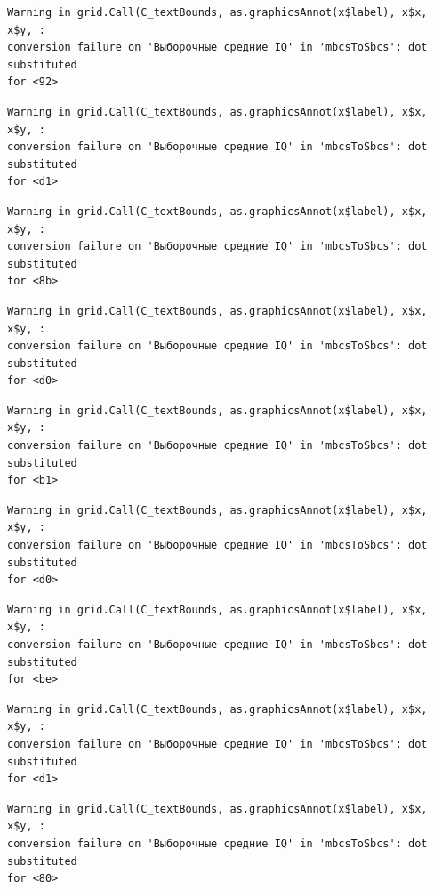 \documentclass[
  letterpaper,
  DIV=11,
  numbers=noendperiod]{scrreprt}
\theoremstyle{definition}
\theoremstyle{remark}
\begin{document}
\begin{verbatim}
Warning in grid.Call(C_textBounds, as.graphicsAnnot(x$label), x$x, x$y, :
conversion failure on 'Выборочные средние IQ' in 'mbcsToSbcs': dot substituted
for <92>
\end{verbatim}

\begin{verbatim}
Warning in grid.Call(C_textBounds, as.graphicsAnnot(x$label), x$x, x$y, :
conversion failure on 'Выборочные средние IQ' in 'mbcsToSbcs': dot substituted
for <d1>
\end{verbatim}

\begin{verbatim}
Warning in grid.Call(C_textBounds, as.graphicsAnnot(x$label), x$x, x$y, :
conversion failure on 'Выборочные средние IQ' in 'mbcsToSbcs': dot substituted
for <8b>
\end{verbatim}

\begin{verbatim}
Warning in grid.Call(C_textBounds, as.graphicsAnnot(x$label), x$x, x$y, :
conversion failure on 'Выборочные средние IQ' in 'mbcsToSbcs': dot substituted
for <d0>
\end{verbatim}

\begin{verbatim}
Warning in grid.Call(C_textBounds, as.graphicsAnnot(x$label), x$x, x$y, :
conversion failure on 'Выборочные средние IQ' in 'mbcsToSbcs': dot substituted
for <b1>
\end{verbatim}

\begin{verbatim}
Warning in grid.Call(C_textBounds, as.graphicsAnnot(x$label), x$x, x$y, :
conversion failure on 'Выборочные средние IQ' in 'mbcsToSbcs': dot substituted
for <d0>
\end{verbatim}

\begin{verbatim}
Warning in grid.Call(C_textBounds, as.graphicsAnnot(x$label), x$x, x$y, :
conversion failure on 'Выборочные средние IQ' in 'mbcsToSbcs': dot substituted
for <be>
\end{verbatim}

\begin{verbatim}
Warning in grid.Call(C_textBounds, as.graphicsAnnot(x$label), x$x, x$y, :
conversion failure on 'Выборочные средние IQ' in 'mbcsToSbcs': dot substituted
for <d1>
\end{verbatim}

\begin{verbatim}
Warning in grid.Call(C_textBounds, as.graphicsAnnot(x$label), x$x, x$y, :
conversion failure on 'Выборочные средние IQ' in 'mbcsToSbcs': dot substituted
for <80>
\end{verbatim}
\end{document}

